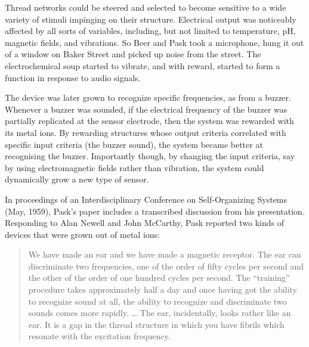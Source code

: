 Thread networks could be steered and selected to become sensitive to a wide variety of stimuli impinging on their structure.
Electrical output was noticeably affected by all sorts of variables, including, but not limited to temperature, pH, magnetic fields, and vibrations.
So Beer and Pask took a microphone, 
hung it out of a window on Baker Street
and picked up noise from the street.
The electrochemical soup started to vibrate, and with reward, started to form a function in response to audio signals.

The device was later grown to recognize specific frequencies, as from a buzzer.
Whenever a buzzer was sounded,
if the electrical frequency of the buzzer was partially replicated at the sensor electrode, 
then the system was rewarded with its metal ions. 
By rewarding structures whose
output criteria correlated with specific input criteria (the buzzer sound), the system became better at recognising the buzzer.
Importantly though, by changing the input criteria, say by using electromagnetic fields rather than vibration, the system could dynamically grow a new type of sensor.


In proceedings of an Interdisciplinary Conference on Self-Organizing Systems 
(May, 1959),
Pask's paper \cite{pask1960natural} includes a transcribed discussion from his presentation.
Responding to Alan Newell and John McCarthy, Pask reported two kinds of devices that were grown out of metal ions:
\begin{quote}
\small
We have made an ear and we have made a magnetic receptor. The
ear can discriminate two frequencies, one of the order of fifty cycles per second and the other of the order of one hundred cycles per second. 
The ``training'' procedure takes approximately half a day and once having got the ability to recognize sound at all, the ability to recognize and discriminate two sounds comes more rapidly. 
\dots
The ear, incidentally, looks rather like an ear. It is a gap in the thread structure in which you have fibrils which resonate with the excitation frequency.
\end{quote}




